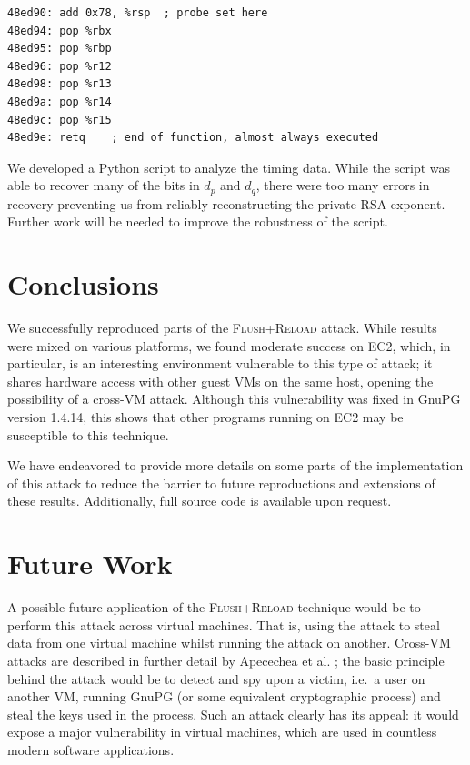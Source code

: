 \documentclass[11pt]{llncs}
\newcommand{\flushreload}{\textsc{Flush}+\textsc{Reload}}
\begin{document}
\begin{lstlisting}[language={[x86masm]Assembler},
    caption={A probe at \texttt{0x08ed90} near the end of
    \texttt{mpihelp\_divrem}, the modulus function, on EC2 hardware.},float=*]
48ed90: add 0x78, %rsp	; probe set here
48ed94: pop %rbx
48ed95: pop %rbp
48ed96: pop %r12
48ed98: pop %r13
48ed9a: pop %r14
48ed9c: pop %r15
48ed9e: retq	; end of function, almost always executed
\end{lstlisting}

We developed a Python script to analyze the timing data. While the script was
able to recover many of the bits in $d_p$ and $d_q$, there were too many errors
in recovery preventing us from reliably reconstructing the private RSA exponent.
Further work will be needed to improve the robustness of the script.

\section{Conclusions}

We successfully reproduced parts of the \flushreload{} attack. While results
were mixed on various platforms, we found moderate success on EC2, which, in
particular, is an interesting environment vulnerable to this type of attack;
it shares hardware access with other guest VMs on the same host, opening the
possibility of a cross-VM attack. Although this vulnerability was fixed in GnuPG
version 1.4.14, this shows that other programs running on EC2 may be susceptible
to this technique.

We have endeavored to provide more details on some parts of the implementation
of this attack to reduce the barrier to future reproductions and
extensions of these results. Additionally, full source code is available upon
request.

\section{Future Work}

A possible future application of the \flushreload{} technique would be to
perform this attack across virtual machines. That is, using the attack to steal
data from one virtual machine whilst running the attack on another. Cross-VM
attacks are described in further detail by Apecechea et al.
\cite{cryptoeprint:2014:248}; the basic principle behind the attack would be to
detect and spy upon a victim, i.e.\ a user on another VM, running GnuPG (or some
equivalent cryptographic process) and steal the keys used in the process. Such
an attack clearly has its appeal: it would expose a major vulnerability in
virtual machines, which are used in countless modern software applications.
\end{document}

